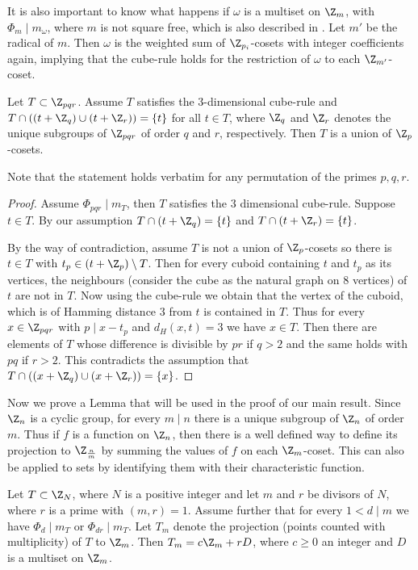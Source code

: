         
        It is also important to know what happens if $\omega$ is a multiset on $\Z_m$, with $\Phi_m \mid m_{\omega}$, where $m$ is not square free, which is also described in \cite{negyen}. Let $m'$ be the radical of $m$. Then $\omega$ is the weighted sum of $\Z_{p_i}$-cosets with integer coefficients again, implying that the cube-rule holds for the restriction of $\omega$ to each $\Z_{m'}$-coset.   
        \begin{lem}\label{lemcuberulecorr}
        Let $T \subset \Z_{pqr}$. Assume $T$ satisfies the $3$-dimensional cube-rule and $T \cap ((t+\Z_q) \cup (t+\Z_r))=\{t\}$ for all $t\in T$, where $\Z_q$ and $\Z_r$ denotes the unique subgroups of $\Z_{pqr}$ of order $q$ and $r$, respectively. Then $T$ is a union of $\Z_p$-cosets.
        \end{lem}
        Note that the statement holds verbatim for any permutation of the primes $p,q,r$.
        \begin{proof}
        Assume $\Phi_{pqr} \mid m_T$, then $T$ satisfies the $3$ dimensional cube-rule. Suppose $t \in T$. By our assumption $T \cap (t+\Z_q)=\{t\}$ and $T \cap (t+\Z_r)=\{t\}$.   
        
        By the way of contradiction, assume $T$ is not a union of $\Z_{p}$-cosets so there is $t \in T$ with $t_p \in (t+\Z_p)\setminus T$. Then for every cuboid containing $t$ and $t_p$ as its vertices, the neighbours (consider the cube as the natural graph on $8$ vertices) of $t$ are not in $T$. Now using the cube-rule we obtain that the vertex of the cuboid, which is of Hamming distance $3$ from $t$ is contained in $T$.
        Thus for every $x \in \Z_{pqr}$ with $p \mid x-t_p$ and $d_H(x,t)=3$ we have $x \in T$. Then there are elements of $T$ whose difference is divisible by $pr$ if $q>2$  and the same holds with  $pq$ if $r>2$. This contradicts the assumption that $T \cap ((x+\Z_q) \cup (x+\Z_r))=\{x\}$.
        \end{proof}
        Now we prove a Lemma that will be used in the proof of our main result. Since $\Z_n$ is a cyclic group, for every $m \mid n$ there is a unique subgroup of $\Z_n$ of order $m$. Thus if $f$ is a function on $\Z_n$, then there is a well defined way to define its projection to $\Z_{\frac{n}{m}}$ by summing the values of $f$ on each $\Z_m$-coset. This can also be applied to sets by identifying them with their characteristic function. 
        \begin{lem}\label{lemprojekcio}
        Let $T \subset \Z_N$, where $N$ is a positive integer and let $m $ and $r$ be divisors of $N$, where $r$ is a prime with $(m,r)=1$. Assume further that for every $1 < d \mid m$ we have $\Phi_d \mid m_T$ or $\Phi_{dr} \mid m_T$. Let $T_m$ denote the projection (points counted with multiplicity) of $T$ to $\Z_m$. Then $T_m=c\Z_m+rD$, where $c \ge 0$ an integer and $D$ is a multiset on $\Z_m$. 
        \end{lem}
